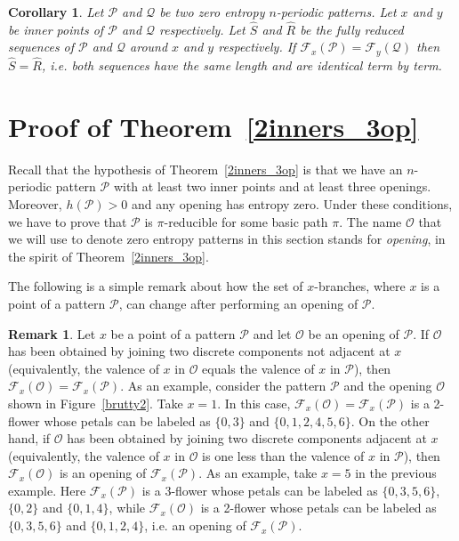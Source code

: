 \documentclass[a4paper]{amsart}
\newtheorem{corollary}[theorem]{Corollary}
\theoremstyle{definition}
\newtheorem{remark}[theorem]{Remark}
\begin{document}
\begin{corollary}\label{bra4}
Let $\mathcal{P}$ and $\mathcal{Q}$ be two zero entropy $n$-periodic patterns. Let $x$ and $y$ be inner points of $\mathcal{P}$ and $\mathcal{Q}$ respectively. Let $\widehat{S}$ and $\widehat{R}$ be the fully reduced sequences of $\mathcal{P}$ and $\mathcal{Q}$ around $x$ and $y$ respectively. If $\mathcal{F}_{x}(\mathcal{P})=\mathcal{F}_{y}(\mathcal{Q})$ then $\widehat{S}=\widehat{R}$, i.e. both sequences have the same length and are identical term by term.
\end{corollary}


\section{Proof of Theorem~\ref{2inners_3op}}\label{S7}
Recall that the hypothesis of Theorem~\ref{2inners_3op} is that we have an $n$-periodic pattern $\mathcal{P}$ with at least two inner points and at least three openings. Moreover, $h(\mathcal{P})>0$ and any opening has entropy zero. Under these conditions, we have to prove that $\mathcal{P}$ is $\pi$-reducible for some basic path $\pi$. The name $\mathcal{O}$ that we will use to denote zero entropy patterns in this section stands for \emph{opening}, in the spirit of Theorem~\ref{2inners_3op}.

The following is a simple remark about how the set of $x$-branches, where $x$ is a point of a pattern $\mathcal{P}$, can change after performing an opening of $\mathcal{P}$.

\begin{remark}\label{branchop}
Let $x$ be a point of a pattern $\mathcal{P}$ and let $\mathcal{O}$ be an opening of $\mathcal{P}$. If $\mathcal{O}$ has been obtained by joining two discrete components not adjacent at $x$
(equivalently, the valence of $x$ in $\mathcal{O}$ equals the valence of $x$ in $\mathcal{P}$), then $\mathcal{F}_x(\mathcal{O})=\mathcal{F}_x(\mathcal{P})$. As an example, consider the pattern $\mathcal{P}$ and the opening $\mathcal{O}$ shown in Figure~\ref{brutty2}. Take $x=1$. In this case, $\mathcal{F}_x(\mathcal{O})=\mathcal{F}_x(\mathcal{P})$ is a 2-flower whose petals can be labeled as $\{0,3\}$ and $\{0,1,2,4,5,6\}$. On the other hand, if $\mathcal{O}$ has been obtained by joining two discrete components adjacent at $x$ (equivalently, the valence of $x$ in $\mathcal{O}$ is one less than the valence of $x$ in $\mathcal{P}$), then $\mathcal{F}_x(\mathcal{O})$ is an opening of $\mathcal{F}_x(\mathcal{P})$. As an example, take $x=5$ in the previous example. Here $\mathcal{F}_x(\mathcal{P})$ is a 3-flower whose petals can be labeled as $\{0,3,5,6\}$, $\{0,2\}$ and $\{0,1,4\}$, while $\mathcal{F}_x(\mathcal{O})$ is a 2-flower whose petals can be labeled as $\{0,3,5,6\}$ and $\{0,1,2,4\}$, i.e. an opening of $\mathcal{F}_x(\mathcal{P})$.
\end{remark}
\end{document}
